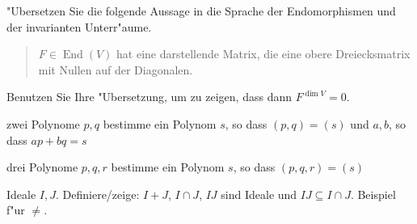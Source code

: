 \documentclass[a4,11pt]{article}
\DeclareMathOperator{\End}{End}
\begin{document}
\begin{aufgabe}
  "Ubersetzen Sie die folgende Aussage in die Sprache der
  Endomorphismen und der invarianten Unterr"aume.
  \begin{quotation}
    $F \in \End(V)$ hat eine darstellende Matrix, die eine obere
    Dreiecksmatrix mit Nullen auf der Diagonalen.
  \end{quotation}

  Benutzen Sie Ihre "Ubersetzung, um zu zeigen, dass dann $F^{\dim V}
  = 0$.
\end{aufgabe}

\begin{aufgabe}
  zwei Polynome $p,q$ bestimme ein Polynom $s$, so dass $(p,q) = (s)$
  und $a,b$, so dass $ap+bq=s$

  drei Polynome $p,q,r$ bestimme ein Polynom $s$, so dass $(p,q,r) = (s)$
\end{aufgabe}

\begin{aufgabe}
Ideale $I,J$. Definiere/zeige: $I+J$, $I \cap J$, $IJ$ sind Ideale und
$IJ \subseteq I \cap J$. Beispiel f"ur $\neq$.  
\end{aufgabe}
\end{document}
